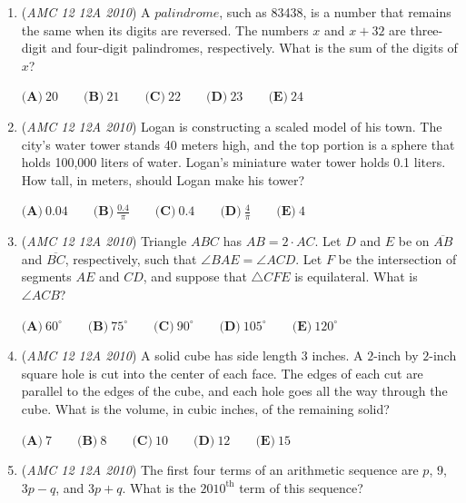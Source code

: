 \begin{enumerate}
 $\textbf{(A)}\ 38 \qquad \textbf{(B)}\ 40 \qquad \textbf{(C)}\ 42 \qquad \textbf{(D)}\ 44 \qquad \textbf{(E)}\ 46$


	\item (\textit{AMC 12 12A 2010}) A $\textit{palindrome}$, such as 83438, is a number that remains the same when its digits are reversed. The numbers $x$ and $x+32$ are three-digit and four-digit palindromes, respectively. What is the sum of the digits of $x$?


 $\textbf{(A)}\ 20 \qquad \textbf{(B)}\ 21 \qquad \textbf{(C)}\ 22 \qquad \textbf{(D)}\ 23 \qquad \textbf{(E)}\ 24$


	\item (\textit{AMC 12 12A 2010}) Logan is constructing a scaled model of his town. The city's water tower stands 40 meters high, and the top portion is a sphere that holds 100,000 liters of water. Logan's miniature water tower holds 0.1 liters. How tall, in meters, should Logan make his tower?


 $\textbf{(A)}\ 0.04 \qquad \textbf{(B)}\ \frac{0.4}{\pi} \qquad \textbf{(C)}\ 0.4 \qquad \textbf{(D)}\ \frac{4}{\pi} \qquad \textbf{(E)}\ 4$


	\item (\textit{AMC 12 12A 2010}) Triangle $ABC$ has $AB=2 \cdot AC$. Let $D$ and $E$ be on $\overline{AB}$ and $\overline{BC}$, respectively, such that $\angle BAE = \angle ACD$. Let $F$ be the intersection of segments $AE$ and $CD$, and suppose that $\triangle CFE$ is equilateral. What is $\angle ACB$?


 $\textbf{(A)}\ 60^\circ \qquad \textbf{(B)}\ 75^\circ \qquad \textbf{(C)}\ 90^\circ \qquad \textbf{(D)}\ 105^\circ \qquad \textbf{(E)}\ 120^\circ$


	\item (\textit{AMC 12 12A 2010}) A solid cube has side length $3$ inches. A $2$-inch by $2$-inch square hole is cut into the center of each face. The edges of each cut are parallel to the edges of the cube, and each hole goes all the way through the cube. What is the volume, in cubic inches, of the remaining solid?


 $\textbf{(A)}\ 7 \qquad \textbf{(B)}\ 8 \qquad \textbf{(C)}\ 10 \qquad \textbf{(D)}\ 12 \qquad \textbf{(E)}\ 15$


	\item (\textit{AMC 12 12A 2010}) The first four terms of an arithmetic sequence are $p$, $9$, $3p-q$, and $3p+q$. What is the $2010^\text{th}$ term of this sequence?



\end{enumerate}
